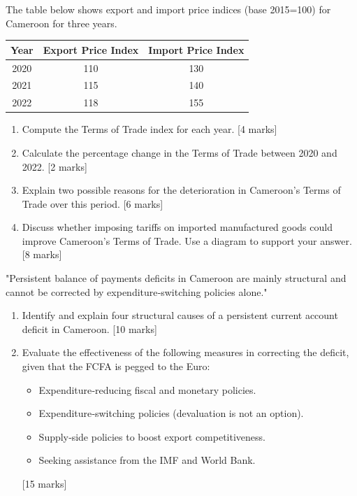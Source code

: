 \documentclass[11pt]{article}
\newcounter{popsec}
\newcounter{popsub}
\newcommand{\courssub}[1]{%
  \stepcounter{popsub}%
  \par\vspace{9pt}\noindent{\popxbold\fontsize{11.5}{13}\selectfont\color{popink}{\color{poporange}\thepopsec.\thepopsub}\hspace{6pt}#1}\par\nopagebreak\vspace{4pt}
}
\begin{document}
\courssub{I prepare for the GCE}

\begin{exercice}
The table below shows export and import price indices (base 2015=100) for Cameroon for three years.

\begin{center}
\begin{tabular}{|c|c|c|}
\hline
Year & Export Price Index & Import Price Index \\
\hline
2020 & 110 & 130 \\
2021 & 115 & 140 \\
2022 & 118 & 155 \\
\hline
\end{tabular}
\end{center}

\begin{enumerate}
\item Compute the Terms of Trade index for each year. [4 marks]
\item Calculate the percentage change in the Terms of Trade between 2020 and 2022. [2 marks]
\item Explain two possible reasons for the deterioration in Cameroon's Terms of Trade over this period. [6 marks]
\item Discuss whether imposing tariffs on imported manufactured goods could improve Cameroon's Terms of Trade. Use a diagram to support your answer. [8 marks]
\end{enumerate}
\end{exercice}

\begin{exercice}
"Persistent balance of payments deficits in Cameroon are mainly structural and cannot be corrected by expenditure‑switching policies alone."

\begin{enumerate}
\item Identify and explain four structural causes of a persistent current account deficit in Cameroon. [10 marks]
\item Evaluate the effectiveness of the following measures in correcting the deficit, given that the FCFA is pegged to the Euro:
\begin{itemize}
\item Expenditure‑reducing fiscal and monetary policies.
\item Expenditure‑switching policies (devaluation is not an option).
\item Supply‑side policies to boost export competitiveness.
\item Seeking assistance from the IMF and World Bank.
\end{itemize}
[15 marks]
\end{enumerate}
\end{exercice}
\end{document}
